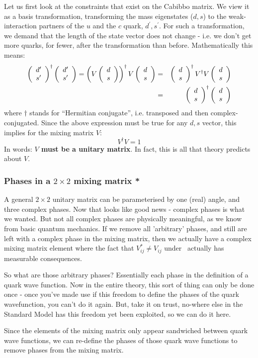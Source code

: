  Let us first look at the constraints that exist on the Cabibbo
 matrix. We view it as a basis transformation, transforming the mass
 eigenstates ($d,s$) to the weak-interaction partners of the $u$ and
 the $c$ quark, $d^{\prime}, s^{\prime}$. For such a
 transformation, we demand that the length of the state vector does
 not change - i.e. we don't get more quarks, for fewer, after the
 transformation than before.
 Mathematically this means:
\begin{eqnarray}
  \left( \begin{array}{c} d^{\prime} \\ s^{\prime} \end{array} \right)^{\dagger}
  \left( \begin{array}{c} d^{\prime} \\ s^{\prime} \end{array} \right)
=
 \left( V  \left( \begin{array}{c} d \\ s \end{array} \right)\right)^{\dagger}
  V  \left( \begin{array}{c} d \\ s \end{array} \right)
&=&
  \left( \begin{array}{c} d \\ s \end{array} \right)^{\dagger}
 V^{\dagger} V
  \left( \begin{array}{c} d \\ s \end{array} \right)
\nonumber\\
&=&
  \left( \begin{array}{c} d \\ s \end{array} \right)^{\dagger}
  \left( \begin{array}{c} d \\ s \end{array} \right)
\end{eqnarray}
 where $\dagger$ stands for ``Hermitian conjugate'', i.e. transposed
 and then complex-conjugated.  Since the above expression must be true
 for any $d,s$ vector, this implies for the mixing matrix $V$:
\begin{equation}
 V^{\dagger} V = 1
\end{equation}
 In words: \textbf{$V$ must be a unitary matrix}. In fact, this is all
 that theory predicts about $V$.

\subsubsection{Phases in a $2\times 2$ mixing matrix *}
 A general $2\times2$ unitary matrix can be parameterised by one
 (real) angle, and three complex phases. Now that looks like good news
 - complex phases is what we wanted. But not all complex phases are
 physically meaningful, as we know from basic quantum mechanics. If we
 remove all 'arbitrary' phases, and still are left with a complex
 phase in the mixing matrix, then we actually have a complex mixing
 matrix element where the fact that $V_{ij}^* \neq V_{ij}$ under \cp\
 actually has measurable consequences.

 So what are those arbitrary phases? Essentially each phase in the
 definition of a quark wave function. Now in the entire theory, this
 sort of thing can only be done once - once you've made use if this
 freedom to define the phases of the quark wavefunction, you can't do
 it again. But, take it on trust, no-where else in the Standard Model
 has this freedom yet been exploited, so we can do it here.

 Since the elements of the mixing matrix only appear sandwiched
 between quark wave functions, we can re-define the phases of those
 quark wave functions to remove phases from the mixing matrix.

